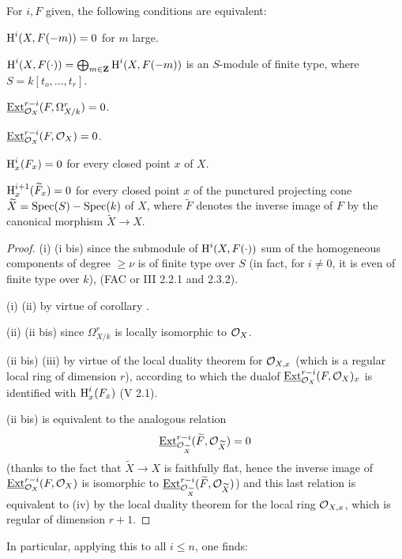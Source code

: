 \begin{corollary} \label{XII.1.3}
For $i, F$ given, the following conditions are equivalent:
\begin{enumeratei}
\item
$\operatorname{H}^i(X, F(-m))=0$ for $m$ large.
\item[\textup{(i bis)}] $\operatorname{H}^i(X, F(\cdot))= \bigoplus_{m\in\mathbf{Z}}\operatorname{H}^i(X, F(-m))$ is an $S$-module of finite type, where $S=k[t_o, \ldots, t_r]$.
\item
$\operatorname{\underline{Ext}}^{r-i}_{\mathcal{O}_X}(F, \Omega_{X/k}^r)=0$.
\item[\textup{(ii bis)}] $\operatorname{\underline{Ext}}^{r-i}_{\mathcal{O}_X}(F, \mathcal{O}_X)=0$.
\item
$\operatorname{H}^i_x(F_x)=0$ for every closed point $x$ of $X$.
\item
$\operatorname{H}^{i+1}_x(\widetilde{F}_x)=0$ for every closed point $x$ of the punctured projecting cone $\widetilde{X}=\operatorname{Spec}(S)-\operatorname{Spec}(k)$ of $X$, where $\widetilde{F}$ denotes the inverse image of $F$ by the canonical morphism $\widetilde{X}\to X$.
\end{enumeratei}
\end{corollary}

\begin{proof}
(i) \SSI (i bis) since the submodule of $\operatorname{H}^i(X, F(\cdot))$ sum of the homogeneous components of degree $\geq \nu$ is of finite type over $S$ (in fact, for $i\neq 0$, it is even of finite type over $k$), (\cf FAC or \EGA III 2.2.1 and 2.3.2).

(i) \SSI (ii) by virtue of corollary .

(ii) \SSI (ii bis) since $\Omega_{X/k}^r$ is locally isomorphic to $\mathcal{O}_X$.

(ii bis) \SSI (iii) by virtue of the local duality theorem for $\mathcal{O}_{X, x}$ (which is a regular local ring of dimension $r$), according to which the \og dual\fg of $\operatorname{\underline{Ext}}^{r-i}_{\mathcal{O}_X}(F, \mathcal{O}_X)_x$ is identified with $\operatorname{H}^i_x(F_x)$ (V 2.1).

(ii bis) is equivalent to the analogous relation
\[
\operatorname{\underline{Ext}}^{r-i}_{{\mathcal O}_{\widetilde{X}}}(\widetilde{F}, {\mathcal O}_{\widetilde{X}})=0
\]
(thanks to the fact that $\widetilde{X}\to X$ is faithfully flat, hence the inverse image of $\operatorname{\underline{Ext}}^{r-i}_{\mathcal{O}_X}(F, \mathcal{O}_X)$ is isomorphic to $\operatorname{\underline{Ext}}^{r-i}_{{\mathcal O}_{\widetilde{X}}}(\widetilde{F}, {\mathcal O}_{\widetilde{X}})$) and this last relation is equivalent to (iv) by the local duality theorem for the local ring $\mathcal{O}_{X, x}$, which is regular of dimension $r+1$.
\skipqed
\end{proof}

In particular, applying this to all $i\leq n$, one finds:

